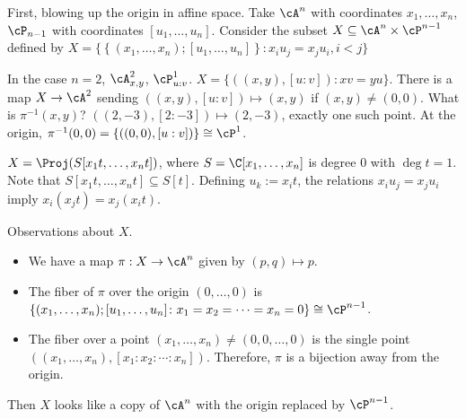 First, blowing up the origin in affine space. Take $\cA^n$ with coordinates $x_1,\ldots,x_n$, $\cP_{n-1}$ with coordinates $[u_1,\ldots,u_n]$. Consider the subset $X \subseteq \cA^n \times \cP^{n-1}$ defined by $X=\{ \left\{(x_1,\ldots,x_n); [u_1,\ldots,u_n] \right\} \colon x_iu_j=x_ju_i, i<j\}$


In the case $n=2$, $\cA^2_{x,y}$, $\cP^1_{u:v}$. $X=\{ ((x,y),[u:v]) \colon xv=yu \}$. There is a map $X \to \cA^2$ sending $((x,y), [u:v]) \mapsto (x,y)$ if $(x,y) \neq (0,0)$. What is $\pi^{-1}(x,y)$? $((2,-3),[2 \colon -3]) \mapsto (2,-3)$, exactly one such point. At the origin, $\pi^{-1}(0,0)= \{ ((0,0), [u:v])\} \cong \cP^1$. 




\begin{rem}
$X= \Proj(S[x_1t,\ldots,x_nt])$, where $S= \C[x_1,\ldots,x_n]$ is degree 0 with $\deg t=1$. Note that $S[x_1t,\ldots,x_nt] \subseteq S[t]$. Defining $u_k:= x_it$, the relations $x_iu_j=x_ju_i$ imply $x_i(x_jt)=x_j(x_it)$. 
\end{rem}


Observations about $X$. 

\begin{itemize}
\item We have a map $\pi: X \to \cA^n$ given by $(p,q) \mapsto p$.
\item The fiber of $\pi$ over the origin $(0,\ldots,0)$ is $\{ (x_1,\ldots,x_n); [u_1,\ldots,u_n] \colon x_1=x_2=\cdots=x_n=0\} \cong \cP^{n-1}$. 
\item The fiber over a point $(x_1,\ldots,x_n) \neq (0,0,\ldots,0)$ is the single point $((x_1,\ldots,x_n),[x_1:x_2:\cdots:x_n])$. Therefore, $\pi$ is a bijection away from the origin. 
\end{itemize}

Then $X$ looks like a copy of $\cA^n$ with the origin replaced by $\cP^{n-1}$. 

